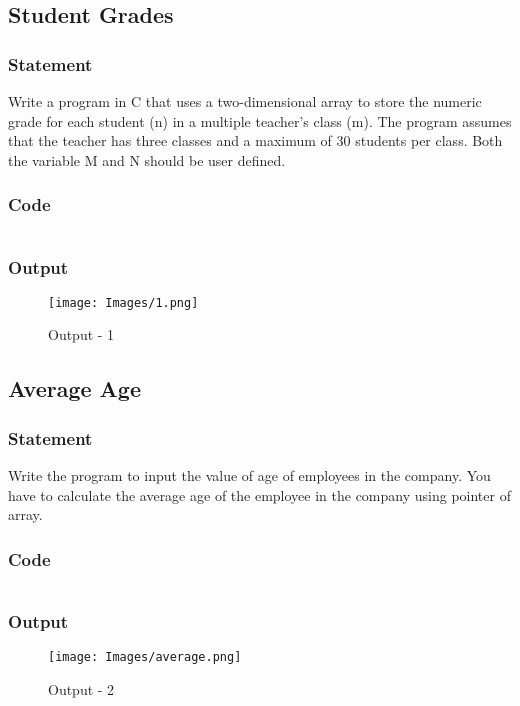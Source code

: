 \subsection{Student Grades}

\subsubsection{Statement}
Write a program in C that uses a two-dimensional array to store the numeric grade for
each student (n) in a multiple teacher’s class (m). The program assumes that the teacher has three
classes and a maximum of 30 students per class. Both the variable M and N should be user
defined.

\subsubsection{Code}
\inputminted[]{c}{./code/student_grades.cpp}
\subsubsection{Output}
\begin{figure}[!htb]
  \centering
  \texttt{[image: Images/1.png]}
  \label{Output-1}
  \caption{Output - 1}
\end{figure}

\pagebreak
\subsection{Average Age}

\subsubsection{Statement}
Write the program to input the value of age of employees in the company. You have to
calculate the average age of the employee in the company using pointer of array.

\subsubsection{Code}
\inputminted[]{c}{./code/average_ages.cpp}
\pagebreak
\subsubsection{Output}
\begin{figure}[!htb]
  \centering
  \texttt{[image: Images/average.png]}
  \label{Output-2}
  \caption{Output - 2}
\end{figure}


